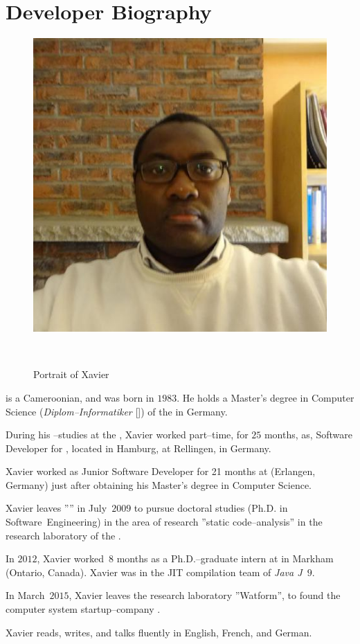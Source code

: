 \section{Developer Biography}\label{chap:biography}
\vspace{-0.9em}
\begin{figure}[!htpb]
\centering
\includegraphics[scale=0.35]{../../francais/images/XavierNOUNDOU-2}
\caption{Portrait of Xavier}~\label{fig:xaviernoumbis}
\end{figure}

 is a Cameroonian,
and was born in $1983$.
He holds a Master's degree in Computer Science
(\emph{Diplom--Informatiker} [\emph{\diplinf}]) of
the \textbf{\unibremen} in Germany.

During his \diplinf--studies at the \unibremen, Xavier worked
part--time, for $25$ months, as, Software Developer for
\textbf{\bergmann}, located in Hamburg, at Rellingen, in Germany.

Xavier worked as Junior Software Developer for 21 months
at \company{\siemens} (Erlangen, Germany) just after
obtaining his Master's degree in Computer Science.

Xavier leaves ''\siemens'' in July~$2009$ to pursue doctoral
studies (Ph.D. in Software~Engineering) in the area of research
''static code--analysis'' in the research laboratory
 of the .

In $2012$, Xavier worked~$8$ months as a Ph.D.--graduate intern
at  in Markham (Ontario, Canada).
Xavier was in the JIT compilation team of \emph{Java J~$9$}.

In March~$2015$, Xavier leaves the research laboratory ''Watform'',
to found the computer system startup--company \company{\yerenlabs}.

Xavier reads, writes, and talks fluently in English,
French, and German.
